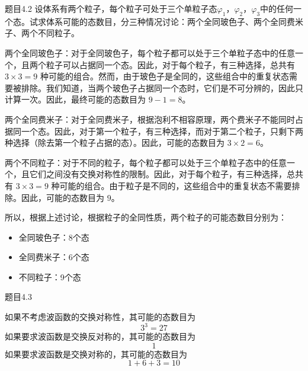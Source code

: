 \begin{question}{题目4.2}
    设体系有两个粒子，每个粒子可处于三个单粒子态$\varphi_1$，$\varphi_2$，$\varphi_3$中的任何一个态。试求体系可能的态数目，分三种情况讨论：两个全同玻色子、两个全同费米子、两个不同粒子。
\end{question}
\begin{solution}
    两个全同玻色子：对于全同玻色子，每个粒子都可以处于三个单粒子态中的任意一个，且两个粒子可以占据同一个态。因此，对于每个粒子，有三种选择，总共有 $3 \times 3 = 9$ 种可能的组合。然而，由于玻色子是全同的，这些组合中的重复状态需要被排除。我们知道，当两个玻色子占据同一个态时，它们是不可分辨的，因此只计算一次。因此，最终可能的态数目为 $9-1=8$。

    两个全同费米子：对于全同费米子，根据泡利不相容原理，两个费米子不能同时占据同一个态。因此，对于第一个粒子，有三种选择，而对于第二个粒子，只剩下两种选择（除去第一个粒子占据的态）。因此，可能的态数目为 $3 \times 2 = 6$。

    两个不同粒子：对于不同的粒子，每个粒子都可以处于三个单粒子态中的任意一个，且它们之间没有交换对称性的限制。因此，对于每个粒子，有三种选择，总共有 $3 \times 3 = 9$ 种可能的组合。由于粒子是不同的，这些组合中的重复状态不需要排除。因此，可能的态数目为 $9$。

    所以，根据上述讨论，根据粒子的全同性质，两个粒子的可能态数目分别为：
    \begin{itemize}
        \item 全同玻色子：8个态
        \item 全同费米子：6个态
        \item 不同粒子：9个态
    \end{itemize}
\end{solution}


\begin{question}{题目4.3}

\end{question}
\begin{solution}
    如果不考虑波函数的交换对称性，其可能的态数目为
    $$
        3^3=27
    $$
    如果要求波函数是交换反对称的，其可能的态数目为
    $$
        1
    $$
    如果要求波函数是交换对称的，其可能的态数目为
    $$
        1+6+3=10
    $$
\end{solution}






